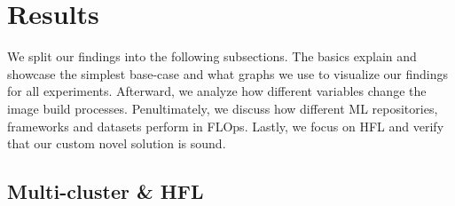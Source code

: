 \section{Results}

We split our findings into the following subsections.
The basics explain and showcase the simplest base-case and what graphs we use to visualize our findings for all experiments.
Afterward, we analyze how different variables change the image build processes.
Penultimately, we discuss how different ML repositories, frameworks and datasets perform in FLOps.
Lastly, we focus on HFL and verify that our custom novel solution is sound.








\subsection{Multi-cluster \& HFL}